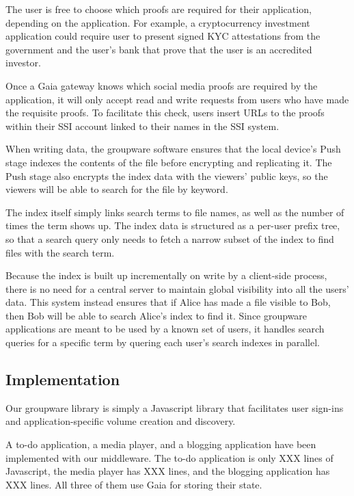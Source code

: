 The user is free to choose which proofs are required for their
application, depending on the application.  For example, a cryptocurrency
investment application could require user to present signed KYC attestations
from the government and the user's bank that prove that the user is an
accredited investor.

Once a Gaia gateway knows which social media proofs are required by the
application, it will only accept read and write requests from users who have
made the requisite proofs.  To facilitate this check, users insert URLs to the
proofs within their SSI account linked to their names in the SSI system.

When writing data, the groupware software ensures that the local device's Push
stage indexes the contents of the file before encrypting and replicating it.
The Push stage also encrypts the index data with the viewers' public keys, so
the viewers will be able to search for the file by keyword.

The index itself simply links search terms to file names, as well as the number
of times the term shows up.  The index data is structured as a per-user prefix tree, so
that a search query only needs to fetch a narrow subset of the index to find
files with the search term.

Because the index is built up incrementally on
write by a client-side process, there is no need for a central server to
maintain global visibility into all the users' data.  This system instead
ensures that if Alice has made a file visible to Bob, then Bob will be able to
search Alice's index to find it.  Since groupware applications are meant to be
used by a known set of users, it handles search queries for a specific term by
quering each user's search indexes in parallel.

\subsection{Implementation}

Our groupware library is simply a Javascript library that facilitates user
sign-ins and application-specific volume creation and discovery.


A to-do application, a media player, and a blogging application have been
implemented with our middleware.  The to-do application is only XXX lines of
Javascript, the media player has XXX lines, and the blogging application has XXX
lines.  All three of them use Gaia for storing their state.

